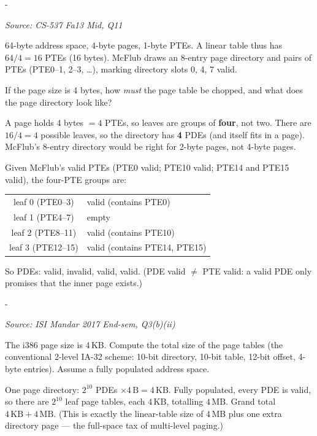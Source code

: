 \documentclass[11pt,a4paper]{article}
\makeatletter
\newcommand{\keepspace}[1]{\par\penalty-100\begingroup
  \setlength{\dimen@}{#1}\dimen@ii\pagegoal\advance\dimen@ii-\pagetotal
  \ifdim\dimen@>\dimen@ii\ifdim\dimen@ii>\z@\vfil\fi\break\fi\endgroup}
\newcounter{qn}[section]
\newenvironment{Qn}[4]{%
  \refstepcounter{qn}\keepspace{7\baselineskip}%
  \begin{tcolorbox}[qboxstyle, title={Q\thesection.\theqn\ \ [#1 \textbar\ #2]\ \ #4}]%
  {\footnotesize\color{g3}\textit{Source: #3}}\par\smallskip%
}{%
  \end{tcolorbox}%
}
\newenvironment{Sol}{%
  \begin{tcolorbox}[sboxstyle, title={Solution}]%
}{%
  \end{tcolorbox}\vspace{0.35em}%
}
\makeatother
\begin{document}
\begin{Qn}{Medium}{Lect 14}{CS-537 Fa13 Mid, Q11}{Chopping a tiny linear table into page-sized leaves}
64-byte address space, 4-byte pages, 1-byte PTEs. A linear table thus
has $64/4=16$ PTEs (16 bytes). McFlub draws an 8-entry page directory
and pairs of PTEs (PTE0--1, 2--3, \ldots), marking directory slots
0, 4, 7 valid.

If the page size is 4 bytes, how \emph{must} the page table be chopped,
and what does the page directory look like?
\end{Qn}
\begin{Sol}
A page holds 4 bytes $= 4$ PTEs, so leaves are groups of \textbf{four},
not two. There are $16/4=4$ possible leaves, so the directory has
\textbf{4} PDEs (and itself fits in a page). McFlub's 8-entry directory
would be right for 2-byte pages, not 4-byte pages.

Given McFlub's valid PTEs (PTE0 valid; PTE10 valid; PTE14 and PTE15
valid), the four-PTE groups are:
\begin{center}
\begin{tabular}{cl}
leaf 0 (PTE0--3)  & valid (contains PTE0) \\
leaf 1 (PTE4--7)  & empty \\
leaf 2 (PTE8--11) & valid (contains PTE10) \\
leaf 3 (PTE12--15)& valid (contains PTE14, PTE15) \\
\end{tabular}
\end{center}
So PDEs: valid, invalid, valid, valid. (PDE valid $\ne$ PTE valid: a
valid PDE only promises that the inner page exists.)
\end{Sol}

\begin{Qn}{Medium-Hard}{Lect 14}{ISI Mandar 2017 End-sem, Q3(b)(ii)}{Maximum page-table size on i386 (4\,KB pages)}
The i386 page size is 4\,KB. Compute the total size of the page tables
(the conventional 2-level IA-32 scheme: 10-bit directory, 10-bit table,
12-bit offset, 4-byte entries). Assume a fully populated address space.
\end{Qn}
\begin{Sol}
One page directory: $2^{10}$ PDEs $\times 4\,\mathrm{B} = 4\,\mathrm{KB}$.
Fully populated, every PDE is valid, so there are $2^{10}$ leaf page
tables, each $4\,\mathrm{KB}$, totalling $4\,\mathrm{MB}$. Grand total
$4\,\mathrm{KB}+4\,\mathrm{MB}$. (This is exactly the linear-table size
of 4\,MB plus one extra directory page --- the full-space tax of
multi-level paging.)
\end{Sol}
\end{document}
